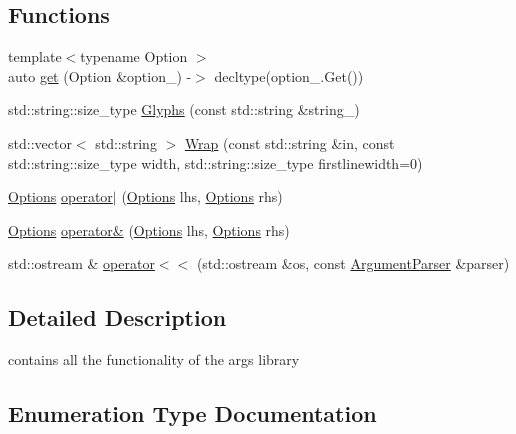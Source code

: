 \subsection*{Functions}
\begin{DoxyCompactItemize}
\item 
{\footnotesize template$<$typename Option $>$ }\\auto \hyperlink{namespaceargs_adbff5cc15191b28f5a1aa74344172ba1}{get} (Option \&option\+\_\+) -\/$>$ decltype(option\+\_\+.\+Get())
\item 
std\+::string\+::size\+\_\+type \hyperlink{namespaceargs_ade9c2a979cc8989ca07f0dfc84b9d19f}{Glyphs} (const std\+::string \&string\+\_\+)
\item 
std\+::vector$<$ std\+::string $>$ \hyperlink{namespaceargs_aea5e48b66d8f87aaa5aafd1243f616f4}{Wrap} (const std\+::string \&in, const std\+::string\+::size\+\_\+type width, std\+::string\+::size\+\_\+type firstlinewidth=0)
\item 
\hyperlink{namespaceargs_aa530c0f95194aa275f49a5f299ac9e77}{Options} \hyperlink{namespaceargs_abaa8eef44af3abe206e0649f24f8be3c}{operator$\vert$} (\hyperlink{namespaceargs_aa530c0f95194aa275f49a5f299ac9e77}{Options} lhs, \hyperlink{namespaceargs_aa530c0f95194aa275f49a5f299ac9e77}{Options} rhs)
\item 
\hyperlink{namespaceargs_aa530c0f95194aa275f49a5f299ac9e77}{Options} \hyperlink{namespaceargs_aa3191c4993dfc1927874db189c43e7e3}{operator\&} (\hyperlink{namespaceargs_aa530c0f95194aa275f49a5f299ac9e77}{Options} lhs, \hyperlink{namespaceargs_aa530c0f95194aa275f49a5f299ac9e77}{Options} rhs)
\item 
std\+::ostream \& \hyperlink{namespaceargs_aa8ea7a3e7cbf85dc70ad2bfc2ff15fb4}{operator$<$$<$} (std\+::ostream \&os, const \hyperlink{classargs_1_1_argument_parser}{Argument\+Parser} \&parser)
\end{DoxyCompactItemize}


\subsection{Detailed Description}
contains all the functionality of the args library 

\subsection{Enumeration Type Documentation}
\mbox{\label{namespaceargs_aa530c0f95194aa275f49a5f299ac9e77}} 
